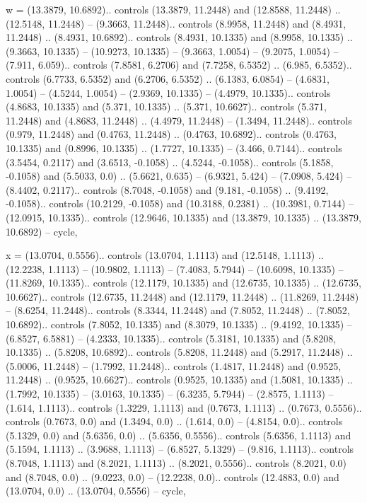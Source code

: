w = {(13.3879, 10.6892).. controls (13.3879, 11.2448) and (12.8588, 11.2448) .. (12.5148, 11.2448) -- (9.3663, 11.2448).. controls (8.9958, 11.2448) and (8.4931, 11.2448) .. (8.4931, 10.6892).. controls (8.4931, 10.1335) and (8.9958, 10.1335) .. (9.3663, 10.1335) -- (10.9273, 10.1335) -- (9.3663, 1.0054) -- (9.2075, 1.0054) -- (7.911, 6.059).. controls (7.8581, 6.2706) and (7.7258, 6.5352) .. (6.985, 6.5352).. controls (6.7733, 6.5352) and (6.2706, 6.5352) .. (6.1383, 6.0854) -- (4.6831, 1.0054) -- (4.5244, 1.0054) -- (2.9369, 10.1335) -- (4.4979, 10.1335).. controls (4.8683, 10.1335) and (5.371, 10.1335) .. (5.371, 10.6627).. controls (5.371, 11.2448) and (4.8683, 11.2448) .. (4.4979, 11.2448) -- (1.3494, 11.2448).. controls (0.979, 11.2448) and (0.4763, 11.2448) .. (0.4763, 10.6892).. controls (0.4763, 10.1335) and (0.8996, 10.1335) .. (1.7727, 10.1335) -- (3.466, 0.7144).. controls (3.5454, 0.2117) and (3.6513, -0.1058) .. (4.5244, -0.1058).. controls (5.1858, -0.1058) and (5.5033, 0.0) .. (5.6621, 0.635) -- (6.9321, 5.424) -- (7.0908, 5.424) -- (8.4402, 0.2117).. controls (8.7048, -0.1058) and (9.181, -0.1058) .. (9.4192, -0.1058).. controls (10.2129, -0.1058) and (10.3188, 0.2381) .. (10.3981, 0.7144) -- (12.0915, 10.1335).. controls (12.9646, 10.1335) and (13.3879, 10.1335) .. (13.3879, 10.6892) -- cycle},

x = {(13.0704, 0.5556).. controls (13.0704, 1.1113) and (12.5148, 1.1113) .. (12.2238, 1.1113) -- (10.9802, 1.1113) -- (7.4083, 5.7944) -- (10.6098, 10.1335) -- (11.8269, 10.1335).. controls (12.1179, 10.1335) and (12.6735, 10.1335) .. (12.6735, 10.6627).. controls (12.6735, 11.2448) and (12.1179, 11.2448) .. (11.8269, 11.2448) -- (8.6254, 11.2448).. controls (8.3344, 11.2448) and (7.8052, 11.2448) .. (7.8052, 10.6892).. controls (7.8052, 10.1335) and (8.3079, 10.1335) .. (9.4192, 10.1335) -- (6.8527, 6.5881) -- (4.2333, 10.1335).. controls (5.3181, 10.1335) and (5.8208, 10.1335) .. (5.8208, 10.6892).. controls (5.8208, 11.2448) and (5.2917, 11.2448) .. (5.0006, 11.2448) -- (1.7992, 11.2448).. controls (1.4817, 11.2448) and (0.9525, 11.2448) .. (0.9525, 10.6627).. controls (0.9525, 10.1335) and (1.5081, 10.1335) .. (1.7992, 10.1335) -- (3.0163, 10.1335) -- (6.3235, 5.7944) -- (2.8575, 1.1113) -- (1.614, 1.1113).. controls (1.3229, 1.1113) and (0.7673, 1.1113) .. (0.7673, 0.5556).. controls (0.7673, 0.0) and (1.3494, 0.0) .. (1.614, 0.0) -- (4.8154, 0.0).. controls (5.1329, 0.0) and (5.6356, 0.0) .. (5.6356, 0.5556).. controls (5.6356, 1.1113) and (5.1594, 1.1113) .. (3.9688, 1.1113) -- (6.8527, 5.1329) -- (9.816, 1.1113).. controls (8.7048, 1.1113) and (8.2021, 1.1113) .. (8.2021, 0.5556).. controls (8.2021, 0.0) and (8.7048, 0.0) .. (9.0223, 0.0) -- (12.2238, 0.0).. controls (12.4883, 0.0) and (13.0704, 0.0) .. (13.0704, 0.5556) -- cycle},

